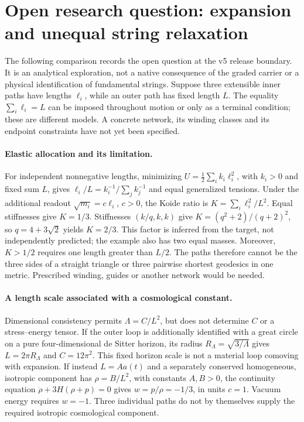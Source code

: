 \section{Open research question: expansion and unequal string relaxation}
\label{sec:v500-string-relaxation}

The following comparison records the open question at the v5 release
boundary. It is an analytical exploration, not a native consequence of
the graded carrier or a physical identification of fundamental strings.
Suppose three extensible inner paths have lengths $\ell_i$, while an
outer path has fixed length $L$. The equality $\sum_i\ell_i=L$ can be
imposed throughout motion or only as a terminal condition; these are
different models. A concrete network, its winding classes and its
endpoint constraints have not yet been specified.

\paragraph{Elastic allocation and its limitation.}
For independent nonnegative lengths, minimizing
$U=\tfrac12\sum_i k_i\ell_i^2$, with $k_i>0$ and fixed sum $L$,
gives $\ell_i/L=k_i^{-1}/\sum_j k_j^{-1}$ and equal generalized
tensions. Under the additional readout $\sqrt{m_i}=c\ell_i$, $c>0$,
the Koide ratio is $K=\sum_i\ell_i^2/L^2$.
Equal stiffnesses give $K=1/3$. Stiffnesses $(k/q,k,k)$ give
$K=(q^2+2)/(q+2)^2$, so $q=4+3\sqrt2$ yields $K=2/3$.
This factor is inferred from the target, not independently predicted;
the example also has two equal masses. Moreover, $K>1/2$ requires one
length greater than $L/2$. The paths therefore cannot be the three
sides of a straight triangle or three pairwise shortest geodesics in
one metric. Prescribed winding, guides or another network would be needed.

\paragraph{A length scale associated with a cosmological constant.}
Dimensional consistency permits $\Lambda=C/L^2$, but does not determine
$C$ or a stress--energy tensor. If the outer loop is additionally
identified with a great circle on a pure four-dimensional de Sitter
horizon, its radius $R_\Lambda=\sqrt{3/\Lambda}$ gives
$L=2\pi R_\Lambda$ and $C=12\pi^2$.
This fixed horizon scale is not a material loop comoving with expansion.
If instead $L=Aa(t)$ and a separately conserved homogeneous,
isotropic component has $\rho=B/L^2$, with constants $A,B>0$, the continuity equation
$\dot\rho+3H(\rho+p)=0$ gives $w=p/\rho=-1/3$, in units $c=1$.
Vacuum energy requires $w=-1$. Three individual paths do not by
themselves supply the required isotropic cosmological component.

